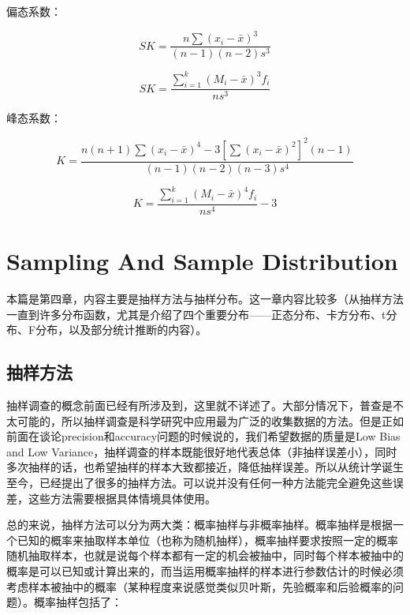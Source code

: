\documentclass[]{ctexbook}
\begin{document}
偏态系数：

\[SK=\frac{n\sum(x_i-\bar{x})^3}{(n-1)(n-2)s^3}\]

\[SK=\frac{\sum_{i=1}^k(M_i-\bar{x})^3f_i}{ns^3}\]

峰态系数：

\[K=\frac{n(n+1)\sum{(x_i-\bar{x})^4}-3[\sum{(x_i-\bar{x})^2}]^2(n-1)}{(n-1)(n-2)(n-3)s^4}\]

\[K=\frac{\sum_{i=1}^k{(M_i-\bar{x})^4f_i}}{ns^4}-3\]

\hypertarget{sampling}{%
\chapter{Sampling And Sample Distribution}\label{sampling}}

本篇是第四章，内容主要是抽样方法与抽样分布。这一章内容比较多（从抽样方法一直到许多分布函数，尤其是介绍了四个重要分布------正态分布、卡方分布、t分布、F分布，以及部分统计推断的内容）。

\hypertarget{ux62bdux6837ux65b9ux6cd5}{%
\section{抽样方法}\label{ux62bdux6837ux65b9ux6cd5}}

抽样调查的概念前面已经有所涉及到，这里就不详述了。大部分情况下，普查是不太可能的，所以抽样调查是科学研究中应用最为广泛的收集数据的方法。但是正如前面在谈论precision和accuracy问题的时候说的，我们希望数据的质量是Low Bias and Low Variance，抽样调查的样本既能很好地代表总体（非抽样误差小），同时多次抽样的话，也希望抽样的样本大致都接近，降低抽样误差。所以从统计学诞生至今，已经提出了很多的抽样方法。可以说并没有任何一种方法能完全避免这些误差，这些方法需要根据具体情境具体使用。

总的来说，抽样方法可以分为两大类：概率抽样与非概率抽样。概率抽样是根据一个已知的概率来抽取样本单位（也称为随机抽样），概率抽样要求按照一定的概率随机抽取样本，也就是说每个样本都有一定的机会被抽中，同时每个样本被抽中的概率是可以已知或计算出来的，而当运用概率抽样的样本进行参数估计的时候必须考虑样本被抽中的概率（某种程度来说感觉类似贝叶斯，先验概率和后验概率的问题）。概率抽样包括了：
\end{document}
